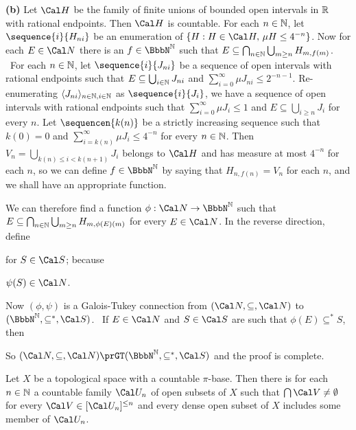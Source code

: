 {{\bf (b)} Let $\Cal H$ be the family of finite unions of bounded open
intervals in $\Bbb R$ with rational endpoints.   Then $\Cal H$ is
countable.   For each $n\in\Bbb N$, let $\sequence{i}{H_{ni}}$ be an
enumeration of $\{H:H\in\Cal H,\,\mu H\le 4^{-n}\}$.   Now for each
$E\in\Cal N$ there is an $f\in\NN$ such that
$E\subseteq\bigcap_{n\in\Bbb N}\bigcup_{m\ge n}H_{m,f(m)}$.   \Prf\ For
each $n\in\Bbb N$, let $\sequence{i}{J_{ni}}$ be a sequence of open
intervals with rational endpoints
such that $E\subseteq\bigcup_{i\in\Bbb N}J_{ni}$ and
$\sum_{i=0}^{\infty}\mu J_{ni}\le 2^{-n-1}$.   Re-enumerating
$\langle J_{ni}\rangle_{n\in\Bbb N,i\in\Bbb N}$ as $\sequence{i}{J_i}$,
we have a sequence of open intervals with rational endpoints such that
$\sum_{i=0}^{\infty}\mu J_i\le 1$ and $E\subseteq\bigcup_{i\ge n}J_i$
for every $n$.   Let $\sequencen{k(n)}$ be a strictly increasing
sequence such that $k(0)=0$ and
$\sum_{i=k(n)}^{\infty}\mu J_i\le 4^{-n}$ for every $n\in\Bbb N$.   Then
$V_n=\bigcup_{k(n)\le i<k(n+1)}J_i$ belongs to $\Cal H$ and has measure
at most $4^{-n}$ for each $n$, so we can define $f\in\NN$ by saying that
$H_{n,f(n)}=V_n$ for each $n$, and we shall have an appropriate
function.\ \Qed

We can therefore find a function $\phi:\Cal N\to\NN$ such that
$E\subseteq\bigcap_{n\in\Bbb N}\bigcup_{m\ge n}H_{m,\phi(E)(m)}$ for
every $E\in\Cal N$.   In the reverse direction, define


\noindent for $S\in\Cal S$;  because


\noindent $\psi(S)\in\Cal N$.

Now $(\phi,\psi)$ is a Galois-Tukey connection from
$(\Cal N,\subseteq,\Cal N)$ to $(\NN,\subseteq^*,\Cal S)$.   \Prf\ If
$E\in\Cal N$ and $S\in\Cal S$ are such that $\phi(E)\subseteq^*S$, then


\noindent So $(\Cal N,\subseteq,\Cal N)\prGT(\NN,\subseteq^*,\Cal S)$
and the proof is complete.
}%

 Let $X$ be a topological
space with a countable $\pi$-base.   Then there is for each $n\in\Bbb N$
a countable family $\Cal U_n$ of open subsets of $X$ such
that $\bigcap\Cal V\ne\emptyset$ for every
$\Cal V\in[\Cal U_n]^{\le n}$ and every dense open subset of $X$
includes some member of $\Cal U_n$.


